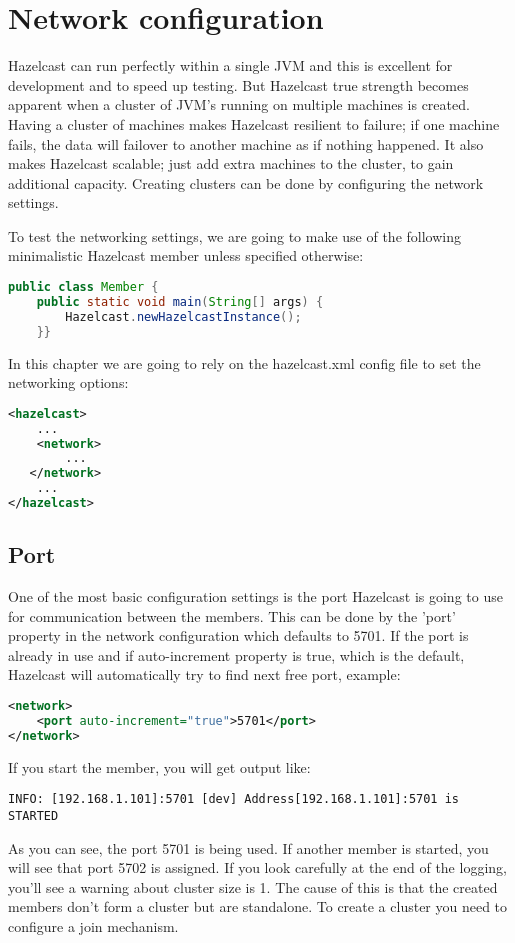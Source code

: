 \chapter{Network configuration}

Hazelcast can run perfectly within a single JVM and this is excellent for development and to speed up testing. But Hazelcast true strength becomes apparent when a cluster of JVM's running on multiple machines is created. Having a cluster of machines makes Hazelcast resilient to failure; if one machine fails, the data will failover to another machine as if nothing happened. It also makes Hazelcast scalable; just add extra machines to the cluster, to gain additional capacity. Creating clusters can be done by configuring the network settings.

To test the networking settings, we are going to make use of the following minimalistic Hazelcast member unless specified otherwise:
\begin{lstlisting}[language=java]
public class Member {
    public static void main(String[] args) {
        Hazelcast.newHazelcastInstance();
    }}
\end{lstlisting}
In this chapter we are going to rely on the hazelcast.xml config file to set the networking options:
\begin{lstlisting}[language=xml]
<hazelcast>
    ...
    <network>
        ...  
   </network>
    ...
</hazelcast>
\end{lstlisting}

\section{Port}
One of the most basic configuration settings is the port Hazelcast is going to use for communication between the members. This can be done by the 'port' property in the network configuration which defaults to 5701. If the port is already in use and if auto-increment property is true, which is the default, Hazelcast will automatically try to find next free port, example:
\begin{lstlisting}[language=xml]
<network>
    <port auto-increment="true">5701</port>
</network>
\end{lstlisting}
If you start the member, you will get output like:
\begin{lstlisting}
INFO: [192.168.1.101]:5701 [dev] Address[192.168.1.101]:5701 is STARTED
\end{lstlisting}
As you can see, the port 5701 is being used. If another member is started, you will see that port 5702 is assigned. If you look carefully at the end of the logging, you'll see a warning about cluster size is 1. The cause of this is that the created members don't form a cluster but are standalone. To create a cluster you need to configure a join mechanism.

